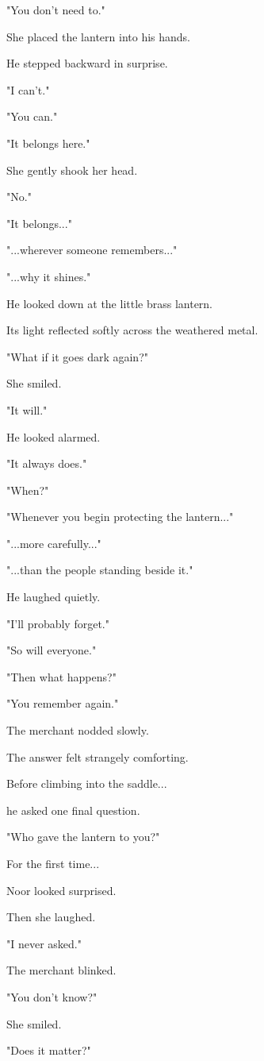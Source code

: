 \documentclass[12pt,openany]{book}
\begin{document}
"You don't need to."

She placed the lantern into his hands.

He stepped backward in surprise.

"I can't."

"You can."

"It belongs here."

She gently shook her head.

"No."

"It belongs..."

"...wherever someone remembers..."

"...why it shines."

He looked down at the little brass lantern.

Its light reflected softly across the weathered metal.

"What if it goes dark again?"

She smiled.

"It will."

He looked alarmed.

"It always does."

"When?"

"Whenever you begin protecting the lantern..."

"...more carefully..."

"...than the people standing beside it."

He laughed quietly.

"I'll probably forget."

"So will everyone."

"Then what happens?"

"You remember again."

The merchant nodded slowly.

The answer felt strangely comforting.

Before climbing into the saddle...

he asked one final question.

"Who gave the lantern to you?"

For the first time...

Noor looked surprised.

Then she laughed.

"I never asked."

The merchant blinked.

"You don't know?"

She smiled.

"Does it matter?"
\end{document}
